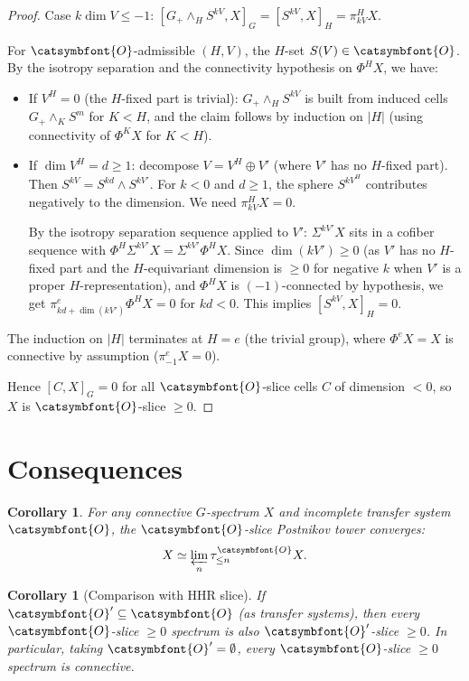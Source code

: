 \documentclass[12pt]{article}
\newtheorem{corollary}[theorem]{Corollary}
\theoremstyle{definition}
\theoremstyle{remark}
\newcommand{\aO}{{\catsymbfont{O}}}
\begin{document}
\begin{proof}
Case $k\dim V \leq -1$:
$[G_+\wedge_H S^{kV}, X]_G = [S^{kV}, X]_H = \pi_{kV}^H X$.

For $\aO$-admissible $(H,V)$, the $H$-set $S(V)\in\aO$.  By the isotropy
separation and the connectivity hypothesis on $\Phi^H X$, we have:
\begin{itemize}
\item If $V^H = 0$ (the $H$-fixed part is trivial): $G_+\wedge_H S^{kV}$
  is built from induced cells $G_+\wedge_K S^m$ for $K < H$, and the claim
  follows by induction on $|H|$ (using connectivity of $\Phi^K X$ for $K<H$).
\item If $\dim V^H = d \geq 1$: decompose $V = V^H \oplus V'$ (where $V'$
  has no $H$-fixed part).  Then $S^{kV} = S^{kd}\wedge S^{kV'}$.  For
  $k < 0$ and $d\geq 1$, the sphere $S^{kV^H}$ contributes negatively to
  the dimension.  We need $\pi_{kV}^H X = 0$.

  By the isotropy separation sequence applied to $V'$:
  $\Sigma^{kV'}X$ sits in a cofiber sequence with $\Phi^H\Sigma^{kV'}X
  = \Sigma^{kV'}\Phi^H X$.  Since $\dim(kV') \geq 0$ (as $V'$ has no
  $H$-fixed part and the $H$-equivariant dimension is $\geq 0$ for negative
  $k$ when $V'$ is a proper $H$-representation), and $\Phi^H X$ is
  $(-1)$-connected by hypothesis, we get $\pi_{kd + \dim(kV')}^e\Phi^H X
  = 0$ for $kd < 0$.  This implies $[S^{kV}, X]_H = 0$.
\end{itemize}

The induction on $|H|$ terminates at $H=e$ (the trivial group), where
$\Phi^e X = X$ is connective by assumption ($\pi_{-1}^e X = 0$).

Hence $[C,X]_G = 0$ for all $\aO$-slice cells $C$ of dimension $< 0$,
so $X$ is $\aO$-slice $\geq 0$.
\end{proof}

\section{Consequences}

\begin{corollary}\label{cor:tower}
For any connective $G$-spectrum $X$ and incomplete transfer system $\aO$,
the $\aO$-slice Postnikov tower converges:
\[
  X \simeq \varprojlim_n \tau_{\leq n}^{\aO} X.
\]
\end{corollary}

\begin{corollary}[Comparison with HHR slice]\label{cor:compare}
If $\aO' \subseteq \aO$ (as transfer systems), then every $\aO$-slice $\geq 0$
spectrum is also $\aO'$-slice $\geq 0$.  In particular, taking $\aO' = \emptyset$,
every $\aO$-slice $\geq 0$ spectrum is connective.
\end{corollary}
\end{document}
